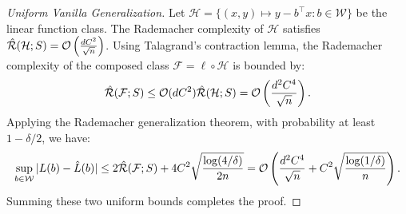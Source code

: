 \begin{proof}[Uniform Vanilla Generalization]
Let $\mathcal{H} = \{(x, y) \mapsto y - b^\top x : b \in \mathcal{W}\}$ be the linear function class. The Rademacher complexity of $\mathcal{H}$ satisfies $\hat{\mathcal{R}}(\mathcal{H}; S) = \mathcal{O}\left( \frac{d C^2}{\sqrt{n}} \right)$. Using Talagrand's contraction lemma, the Rademacher complexity of the composed class $\mathcal{F} = \ell \circ \mathcal{H}$ is bounded by:
\begin{equation}
    \hat{\mathcal{R}}(\mathcal{F}; S) \le \mathcal{O}(dC^2) \hat{\mathcal{R}}(\mathcal{H}; S) = \mathcal{O}\left( \frac{d^2 C^4}{\sqrt{n}} \right).
\end{equation}
Applying the Rademacher generalization theorem, with probability at least $1 - \delta/2$, we have:
\begin{equation}
    \sup_{b \in \mathcal{W}} |L(b) - \hat{L}(b)| \le 2\hat{\mathcal{R}}(\mathcal{F}; S) + 4C^2 \sqrt{\frac{\log(4/\delta)}{2n}} = \mathcal{O}\left( \frac{d^2 C^4}{\sqrt{n}} + C^2\sqrt{\frac{\log(1/\delta)}{n}} \right).
\end{equation}
Summing these two uniform bounds completes the proof.
\end{proof}

